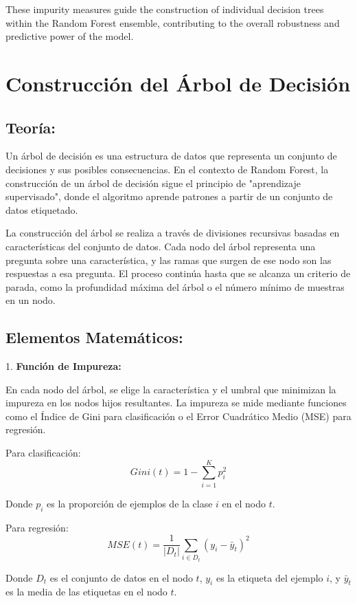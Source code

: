 \documentclass{article}
\begin{document}
These impurity measures guide the construction of individual decision trees within the Random Forest ensemble, contributing to the overall robustness and predictive power of the model.


\section{Construcción del Árbol de Decisión}

\subsection{Teoría:}

Un árbol de decisión es una estructura de datos que representa un conjunto de decisiones y sus posibles consecuencias. En el contexto de Random Forest, la construcción de un árbol de decisión sigue el principio de "aprendizaje supervisado", donde el algoritmo aprende patrones a partir de un conjunto de datos etiquetado.

La construcción del árbol se realiza a través de divisiones recursivas basadas en características del conjunto de datos. Cada nodo del árbol representa una pregunta sobre una característica, y las ramas que surgen de ese nodo son las respuestas a esa pregunta. El proceso continúa hasta que se alcanza un criterio de parada, como la profundidad máxima del árbol o el número mínimo de muestras en un nodo.

\subsection{Elementos Matemáticos:}

1. \textbf{Función de Impureza:}

En cada nodo del árbol, se elige la característica y el umbral que minimizan la impureza en los nodos hijos resultantes. La impureza se mide mediante funciones como el Índice de Gini para clasificación o el Error Cuadrático Medio (MSE) para regresión.

Para clasificación:
\[ Gini(t) = 1 - \sum_{i=1}^{K} p_i^2 \]

Donde \( p_i \) es la proporción de ejemplos de la clase \( i \) en el nodo \( t \).

Para regresión:
\[ MSE(t) = \frac{1}{|D_t|} \sum_{i \in D_t} (y_i - \bar{y}_t)^2 \]

Donde \( D_t \) es el conjunto de datos en el nodo \( t \), \( y_i \) es la etiqueta del ejemplo \( i \), y \( \bar{y}_t \) es la media de las etiquetas en el nodo \( t \).
\end{document}
